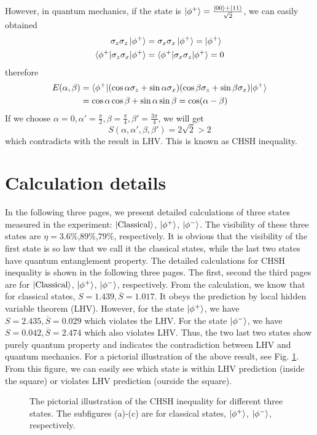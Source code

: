 \documentclass[12pt,a4paper]{article}
\begin{document}
However, in quantum mechanics, if the state is $\ket{\phi^{+}}=\frac{\ket{00}+\ket{11}}{\sqrt{2}}$,
we can easily obtained
\begin{align*}
\sigma_{z}\sigma_{z}\ket{\phi^{+}} & =\sigma_{x}\sigma_{x}\ket{\phi^{+}}=\ket{\phi^{+}}\\
\braket{\phi^{+}|\sigma_{z}\sigma_{x}|\phi^{+}} & =\braket{\phi^{+}|\sigma_{x}\sigma_{z}|\phi^{+}}=0
\end{align*}
therefore
\begin{align*}
E(\alpha,\beta) & =\braket{\phi^{+}|(\cos\alpha\sigma_{z}+\sin\alpha\sigma_{x})(\cos\beta\sigma_{z}+\sin\beta\sigma_{x})|\phi^{+}}\\
 & =\cos\alpha\cos\beta+\sin\alpha\sin\beta=\cos(\alpha-\beta)
\end{align*}
If we choose $\alpha=0,\alpha'=\frac{\pi}{2},\beta=\frac{\pi}{4},\beta'=\frac{3\pi}{4}$,
we will get
\begin{equation}
S(\alpha,\alpha',\beta,\beta')=2\sqrt{2}>2
\end{equation}
which contradicts with the result in LHV. This is known as CHSH inequality.
%
\section{Calculation details}
In the following three pages, we present detailed calculations of three states measured in the experiment: $\ket{\mathrm{Classical}}$, $\ket{\phi^{+}}$, $\ket{\phi^{-}}$. The visibility of these three states are $\eta=3.6\%$,$89\%$,$79\%$, respectively. It is obvious that the visibility of the first state is so law that we call it the classical states, while the last two states have quantum entanglement property.
The detailed calculations for CHSH inequality is shown in the following three pages. The first, second the third pages are for $\ket{\mathrm{Classical}}$, $\ket{\phi^{+}}$, $\ket{\phi^{-}}$, respectively. From the calculation, we know that for classical states, $S=1.439,\overline{S}=1.017$. It obeys the prediction by local hidden variable theorem (LHV). However, for the state $\ket{\phi^{+}}$, we have $S=2.435,\overline{S}=0.029$ which violates the LHV. For the state $\ket{\phi^{-}}$, we have $S=0.042,\overline{S}=2.474$ which also violates LHV. Thus, the two last two states show purely quantum property and indicates the contradiction between LHV and quantum mechanics.
For a pictorial illustration of the above result, see Fig. \ref{illustration_figures}. From this figure, we can easily see which state is within LHV prediction (inside the square) or violates LHV prediction (ourside the square).
\begin{figure}

\caption{The pictorial illustration of the CHSH inequality for different three
states. The subfigures (a)-(c) are for classical states, $\ket{\phi^{+}}$,
$\ket{\phi^{-}}$, respectively.}

\label{illustration_figures}
\end{figure}
\end{document}
